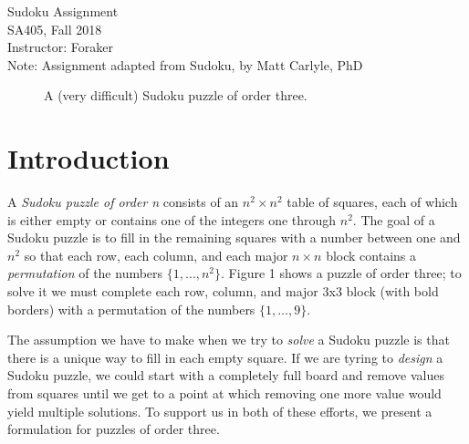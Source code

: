 \documentclass[10pt]{article}
\begin{document}
\begin{center}
  {\sc Sudoku Assignment}\\
  {\sc SA405, Fall 2018} \\
  {\sc Instructor: Foraker} \\
 {\sc Note:  Assignment adapted from Sudoku, by Matt Carlyle, PhD}
\end{center}

\medskip

\begin{figure}[!h]
\centering
\begin{center}
\caption{A (very difficult) Sudoku puzzle of order three.}
\end{center}
\end{figure}

\section{Introduction}
A {\it Sudoku puzzle of order n} consists of an $n^2 \times n^2$ table of squares, each of which is either empty or contains one of the integers one through $n^2$.  The goal of a Sudoku puzzle is to fill in the remaining squares with a number between one and $n^2$ so that each row, each column, and each major $n \times n$ block contains a {\it permutation} of the numbers $\{ 1,\dots ,n^2 \}$.  Figure 1 shows a puzzle of order three; to solve it we must complete each row, column, and major 3x3 block (with bold borders) with a permutation of the numbers $\{1,\dots,9\}$.

The assumption we have to make when we try to {\it solve} a Sudoku puzzle is that there is a unique way to fill in each empty square.  If we are tyring to {\it design} a Sudoku puzzle, we could start with a completely full board and remove values from squares until we get to a point at which removing one more value would yield multiple solutions.  To support us in both of these efforts, we present a formulation for puzzles of order three.
\end{document}

